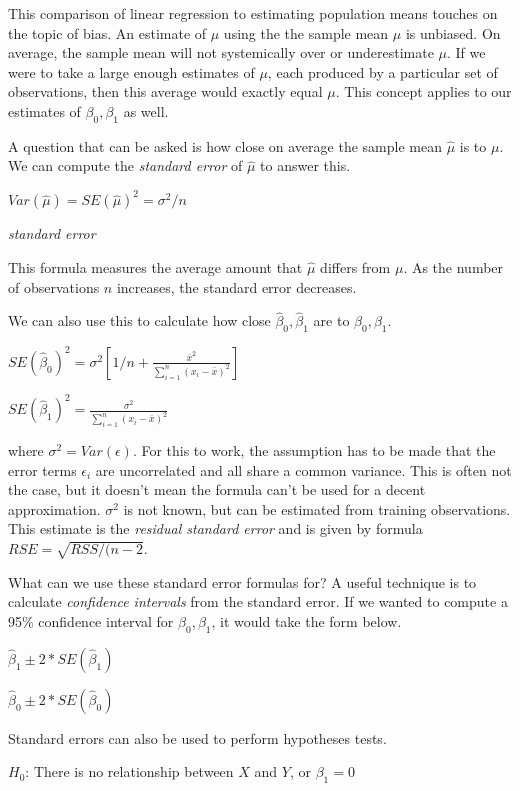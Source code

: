 \documentclass[]{book}
\begin{document}
This comparison of linear regression to estimating population means touches on the topic of bias. An estimate of \(\mu\) using the the sample mean \(\hat\mu\) is unbiased. On average, the sample mean will not systemically over or underestimate \(\mu\). If we were to take a large enough estimates of \(\mu\), each produced by a particular set of observations, then this average would exactly equal \(\mu\). This concept applies to our estimates of \(\beta_0, \beta_1\) as well.

A question that can be asked is how close on average the sample mean \(\hat\mu\) is to \(\mu\). We can compute the \emph{standard error} of \(\hat\mu\) to answer this.

\(Var(\hat\mu) = SE(\hat\mu)^2 = \sigma^2/n\)

\emph{standard error}

This formula measures the average amount that \(\hat\mu\) differs from \(\mu\). As the number of observations \(n\) increases, the standard error decreases.

We can also use this to calculate how close \(\hat\beta_0, \hat\beta_1\) are to \(\beta_0, \beta_1\).

\(SE(\hat\beta_0)^2= \sigma^2 \left[1/n + \frac{\displaystyle \bar x^2}{\displaystyle\sum_{i=1}^{n}(x_i - \bar x)^2} \right]\)

\(SE(\hat\beta_1)^2=\frac{\displaystyle \sigma^2}{\displaystyle\sum_{i=1}^{n}(x_i - \bar x)^2}\)

where \(\sigma^2 = Var(\epsilon)\). For this to work, the assumption has to be made that the error terms \(\epsilon_i\) are uncorrelated and all share a common variance. This is often not the case, but it doesn't mean the formula can't be used for a decent approximation. \(\sigma^2\) is not known, but can be estimated from training observations. This estimate is the \emph{residual standard error} and is given by formula \(RSE = \sqrt{RSS/(n-2}\).

What can we use these standard error formulas for? A useful technique is to calculate \emph{confidence intervals} from the standard error. If we wanted to compute a 95\% confidence interval for \(\beta_0,\beta_1\), it would take the form below.

\(\hat\beta_1 \pm 2 * SE(\hat\beta_1)\)

\(\hat\beta_0 \pm 2 * SE(\hat\beta_0)\)

Standard errors can also be used to perform hypotheses tests.

\(H_0\): There is no relationship between \(X\) and \(Y\), or \(\beta_1 = 0\)
\end{document}
